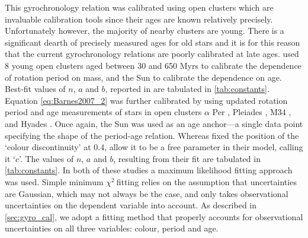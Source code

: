 \documentclass[10pt,preprint]{aastex}
\newcommand{\chit}{$\chi^2$}
\begin{document}
This gyrochronology relation was calibrated using open clusters which are invaluable calibration tools since their ages are known relatively precisely.
Unfortunately however, the majority of nearby clusters are young.
There is a significant dearth of precisely measured ages for old stars and it is for this reason that the current gyrochronology relations are poorly calibrated at late ages.
\citet{Barnes2007} used 8 young open clusters aged between 30 and 650 Myrs to calibrate the dependence of rotation period on mass, and the Sun to calibrate the dependence on age.
Best-fit values of $n$, $a$ and $b$, reported in \citet{Barnes2007} are tabulated in \ref{tab:constants}.
Equation \ref{eq:Barnes2007_2} was further calibrated by \citet{Mamajek2008} using updated rotation period and age measurements of stars in open clusters $\alpha$ Per \citep{Prosser1995}, Pleiades \citep{Prosser1995, Krishnamurthi1998}, M34 \citep{Meibom2011_M34}, and Hyades \citep[][; Henry, private comm.]{Radick1987, Radick1995, Prosser1995, Paulson2004}.
Once again, the Sun was used as an age anchor---a single data point specifying the shape of the period-age relation.
Whereas \citet{Barnes2007} fixed the position of the `colour discontinuity' at 0.4, \citet{Mamajek2008} allow it to be a free parameter in their model, calling it `$c$'.
The values of $n$, $a$ and $b$, resulting from their fit are tabulated in \ref{tab:constants}.
In both of these studies a maximum likelihood fitting approach was used.
Simple minimum \chit$~$fitting relies on the assumption that uncertainties are Gaussian, which may not always be the case, and only takes observational uncertainties on the dependent variable into account.
As described in \textsection \ref{sec:gyro_cal}, we adopt a fitting method that properly accounts for observational uncertainties on all three variables: colour, period and age.
\end{document}
